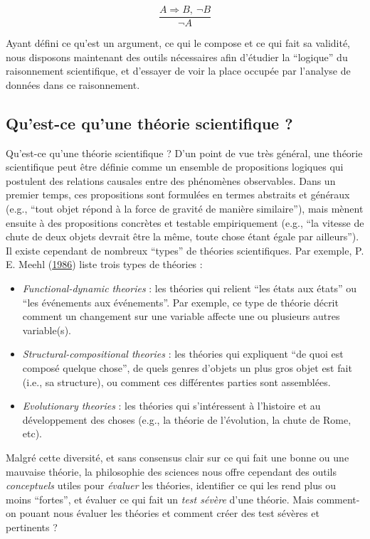 \documentclass[
  a4paper,11pt,twoside,onecolumn,openright,final,oldfontcommands]{memoir}
\theoremstyle{definition}
\theoremstyle{definition}
\theoremstyle{definition}
\theoremstyle{definition}
\theoremstyle{remark}
\begin{document}
\[\dfrac{A \Rightarrow B, \ \neg B}{\neg A}\]

Ayant défini ce qu'est un argument, ce qui le compose et ce qui fait sa validité, nous disposons maintenant des outils nécessaires afin d'étudier la ``logique'' du raisonnement scientifique, et d'essayer de voir la place occupée par l'analyse de données dans ce raisonnement.

\hypertarget{quest-ce-quune-thuxe9orie-scientifique}{%
\subsection{Qu'est-ce qu'une théorie scientifique ?}\label{quest-ce-quune-thuxe9orie-scientifique}}

Qu'est-ce qu'une théorie scientifique ? D'un point de vue très général, une théorie scientifique peut être définie comme un ensemble de propositions logiques qui postulent des relations causales entre des phénomènes observables. Dans un premier temps, ces propositions sont formulées en termes abstraits et généraux (e.g., ``tout objet répond à la force de gravité de manière similaire''), mais mènent ensuite à des propositions concrètes et testable empiriquement (e.g., ``la vitesse de chute de deux objets devrait être la même, toute chose étant égale par ailleurs''). Il existe cependant de nombreux ``types'' de théories scientifiques. Par exemple, P. E. Meehl (\protect\hyperlink{ref-meehl_what_1986}{1986}) liste trois types de théories :

\begin{itemize}
\item
  \emph{Functional-dynamic theories} : les théories qui relient ``les états aux états'' ou ``les événements aux événements''. Par exemple, ce type de théorie décrit comment un changement sur une variable affecte une ou plusieurs autres variable(s).
\item
  \emph{Structural-compositional theories} : les théories qui expliquent ``de quoi est composé quelque chose'', de quels genres d'objets un plus gros objet est fait (i.e., sa structure), ou comment ces différentes parties sont assemblées.
\item
  \emph{Evolutionary theories} : les théories qui s'intéressent à l'histoire et au développement des choses (e.g., la théorie de l'évolution, la chute de Rome, etc).
\end{itemize}

Malgré cette diversité, et sans consensus clair sur ce qui fait une bonne ou une mauvaise théorie, la philosophie des sciences nous offre cependant des outils \emph{conceptuels} utiles pour \emph{évaluer} les théories, identifier ce qui les rend plus ou moins ``fortes'', et évaluer ce qui fait un \emph{test sévère} d'une théorie. Mais comment-on pouant nous évaluer les théories et comment créer des test sévères et pertinents ?
\end{document}
